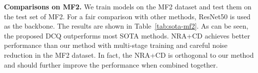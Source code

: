 \documentclass[10pt,twocolumn,letterpaper]{article}
\begin{document}
\begin{table}[h]\centering
   \footnotesize
   \caption{\textbf{SOTA comparisons on models trained with MS1MV2.}\label{tab:sota-ms1mv2}}
\end{table}

\textbf{Comparisons on MF2.} We train models on the MF2 dataset and test them on the test set of MF2. For a fair comparison with other methods, ResNet50 is used as the backbone. The results are shown in Table~\ref{tab:sota-mf2}. As can be seen, the proposed DCQ outperforms most SOTA methods. NRA+CD achieves better performance than our method with multi-stage training and careful noise reduction in the MF2 dataset. In fact, the NRA+CD is orthogonal to our method and should further improve the performance when combined together.
\end{document}
